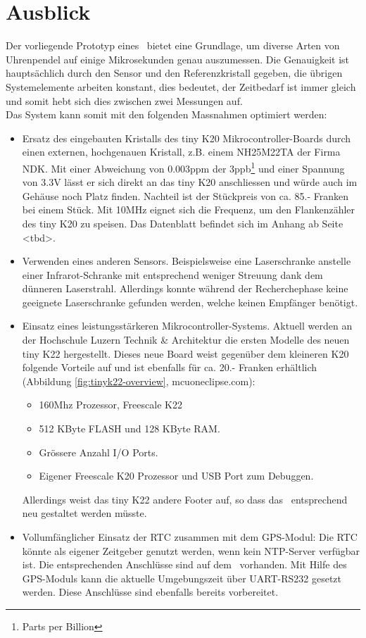 \section{Ausblick}
Der vorliegende Prototyp eines \documenttitle\ bietet eine Grundlage, um diverse Arten von Uhrenpendel auf einige Mikrosekunden genau auszumessen. Die Genauigkeit ist hauptsächlich durch den Sensor und den Referenzkristall gegeben, die übrigen Systemelemente arbeiten konstant, dies bedeutet, der Zeitbedarf ist immer gleich und somit hebt sich dies zwischen zwei Messungen auf.\\
Das System kann somit mit den folgenden Massnahmen optimiert werden:
\begin{itemize}
	\item Ersatz des eingebauten Kristalls des tiny K20 Mikrocontroller-Boards durch einen externen, hochgenauen Kristall, z.B. einem NH25M22TA der Firma NDK. Mit einer Abweichung von 0.003ppm der 3ppb\footnote{Parts per Billion} und einer Spannung von 3.3V lässt er sich direkt an das tiny K20 anschliessen und würde auch im Gehäuse noch Platz finden. Nachteil ist der Stückpreis von ca. 85.- Franken bei einem Stück. Mit 10MHz eignet sich die Frequenz, um den Flankenzähler des tiny K20 zu speisen. Das Datenblatt befindet sich im Anhang ab Seite <tbd>.
	\item Verwenden eines anderen Sensors. Beispielsweise eine Laserschranke anstelle einer Infrarot-Schranke mit entsprechend weniger Streuung dank dem dünneren Laserstrahl. Allerdings konnte während der Recherchephase keine geeignete Laserschranke gefunden werden, welche keinen Empfänger benötigt.
	\item Einsatz eines leistungsstärkeren Mikrocontroller-Systems. Aktuell werden an der Hochschule Luzern Technik \& Architektur die ersten Modelle des neuen tiny K22 hergestellt. Dieses neue Board weist gegenüber dem kleineren K20 folgende Vorteile auf und ist ebenfalls für ca. 20.- Franken erhältlich (Abbildung \ref{fig:tinyk22-overview}, mcuoneclipse.com):
	\begin{itemize}
		\item 160Mhz Prozessor, Freescale K22
		\item 512 KByte FLASH und 128 KByte RAM.
		\item Grössere Anzahl I/O Ports.
		\item Eigener Freescale K20 Prozessor und USB Port zum Debuggen. 
	\end{itemize}
	Allerdings weist das tiny K22 andere Footer auf, so dass das \hwb\ entsprechend neu gestaltet werden müsste.
	\item Vollumfänglicher Einsatz der RTC zusammen mit dem GPS-Modul: Die RTC könnte als eigener Zeitgeber genutzt werden, wenn kein NTP-Server verfügbar ist. Die entsprechenden \iic Anschlüsse sind auf dem \hwb\ vorhanden. Mit Hilfe des GPS-Moduls kann die aktuelle Umgebungszeit über UART-RS232 gesetzt werden. Diese Anschlüsse sind ebenfalls bereits vorbereitet.  
\end{itemize}
